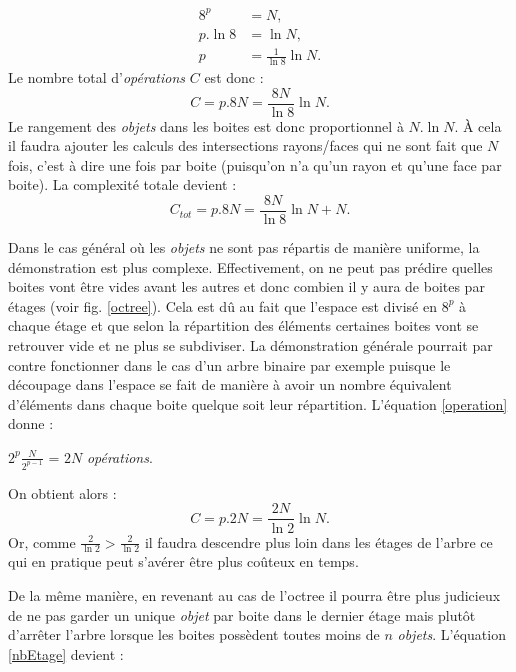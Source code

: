 \begin{align}  \label{nbEtage}
8^p &= N \nonumber, \\
p.\ln{8} &= \ln{N} \nonumber, \\
p &= \frac{1}{\ln{8}}\ln{N}.
\end{align}
%
Le nombre total d'\textit{opérations} $C$ est donc :
\begin{equation}
C = p.8N = \frac{8N}{\ln8}\ln{N}.
\end{equation}
Le rangement des \textit{objets} dans les boites est donc proportionnel à $N.\ln{N}$. À cela il faudra ajouter les calculs des intersections rayons/faces qui ne sont fait que $N$ fois, c'est à dire une fois par boite (puisqu'on n'a qu'un rayon et qu'une face par boite). La complexité totale devient :
\begin{equation}
C_{tot} = p.8N = \frac{8N}{\ln8}\ln{N} + N.
\end{equation}

Dans le cas général où les \textit{objets} ne sont pas répartis de manière uniforme, la démonstration est plus complexe. Effectivement, on ne peut pas prédire quelles boites vont être vides avant les autres et donc combien il y aura de boites par étages (voir fig. \ref{octree}). Cela est dû au fait que l'espace est divisé en $8^p$ à chaque étage et que selon la répartition des éléments certaines boites vont se retrouver vide et ne plus se subdiviser. La démonstration générale pourrait par contre fonctionner dans le cas d'un arbre binaire par exemple puisque le découpage dans l'espace se fait de manière à avoir un nombre équivalent d'éléments dans chaque boite quelque soit leur répartition. L'équation \ref{operation} donne :

\begin{center}
$2^p\frac{N}{2^{p-1}}$ = $2N$ \textit{opérations}.
\end{center}
On obtient alors :
\begin{equation}
C = p.2N = \frac{2N}{\ln2}\ln{N}.
\end{equation} 
Or, comme $\frac{2}{\ln2} > \frac{2}{\ln2}$ il faudra descendre plus loin dans les étages de l'arbre ce qui en pratique peut s'avérer être plus coûteux en temps.

De la même manière, en revenant au cas de l'\gls{octree} il pourra être plus judicieux de ne pas garder un unique \textit{objet} par boite dans le dernier étage mais plutôt d'arrêter l'arbre lorsque les boites possèdent toutes moins de $n$ \textit{objets}. L'équation \ref{nbEtage} devient :

